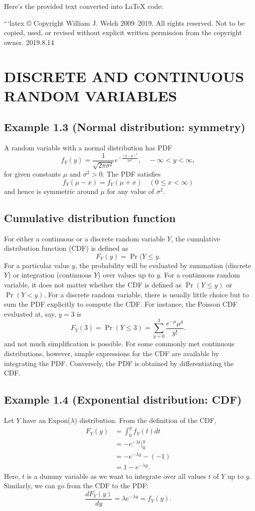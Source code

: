 Here's the provided text converted into LaTeX code:

```latex
© Copyright William J. Welch 2009--2019. All rights reserved. Not to be copied, used, or revised without explicit written permission from the copyright owner. 2019.8.14

\section{DISCRETE AND CONTINUOUS RANDOM VARIABLES}

\subsection{Example 1.3 (Normal distribution: symmetry)}
A random variable with a normal distribution has PDF
\[
f_Y(y) = \frac{1}{\sqrt{2 \pi \sigma^2}} e^{-\frac{(y-\mu)^2}{2\sigma^2}}, \quad -\infty < y < \infty,
\]
for given constants $\mu$ and $\sigma^2 > 0$. The PDF satisfies
\[
f_Y(\mu - x) = f_Y(\mu + x) \quad (0 \leq x < \infty)
\]
and hence is symmetric around $\mu$ for any value of $\sigma^2$.

\subsection{Cumulative distribution function}
For either a continuous or a discrete random variable $Y$, the cumulative distribution function (CDF) is defined as
\[
F_Y(y) = \Pr(Y \leq y.
\]
For a particular value $y$, the probability will be evaluated by summation (discrete $Y$) or integration (continuous $Y$) over values up to $y$. For a continuous random variable, it does not matter whether the CDF is defined as $\Pr(Y \leq y)$ or $\Pr(Y < y)$. For a discrete random variable, there is usually little choice but to sum the PDF explicitly to compute the CDF. For instance, the Poisson CDF evaluated at, say, 
$y=3$ is
\[
F_Y(3) = \Pr(Y \leq 3) = \sum_{y=0}^{3} \frac{e^{-\mu} \mu^y}{y!}.
\]
and not much simplification is possible. For some commonly met continuous distributions, however, simple expressions for the CDF are available by integrating the PDF. Conversely, the PDF is obtained by differentiating the CDF.

\subsection{Example 1.4 (Exponential distribution: CDF)}
Let $Y$ have an Expon($\lambda$) distribution. From the definition of the CDF,
\[
\begin{align*}
F_Y(y) &= \int_0^y f_Y(t) dt \\
&= -e^{-\lambda t} \bigg|_0^y \\
&= -e^{-\lambda y} - (-1) \\
&= 1 - e^{-\lambda y}.
\end{align*}
\]
Here, $t$ is a dummy variable as we want to integrate over all values $t$ of $Y$ up to $y.$ Similarly, we can go from the CDF to the PDF:
\[
\frac{dF_Y(y)}{dy} = \lambda e^{-\lambda y} = f_Y(y).
\]

